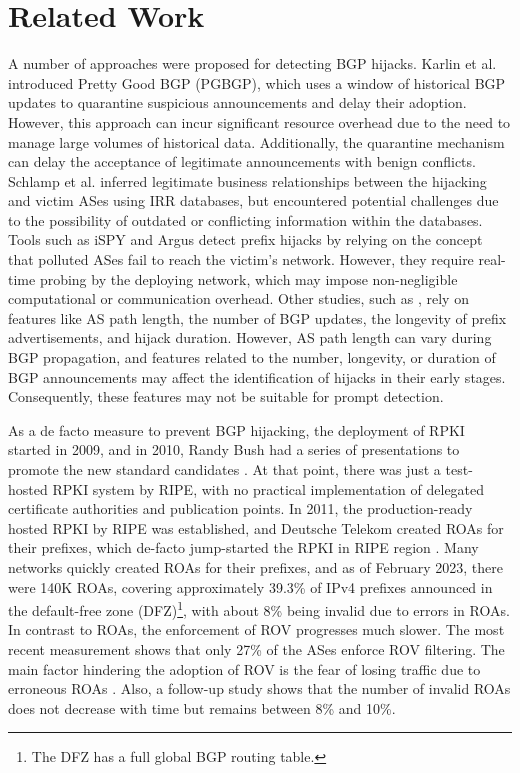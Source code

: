 \section{Related Work}
\label{sec:relatedwork}
A number of approaches were proposed for detecting BGP hijacks.
Karlin et al. \cite{karlin2006pretty} introduced Pretty Good BGP (PGBGP), which uses a window of historical BGP updates to quarantine suspicious announcements and delay their adoption. However, this approach can incur significant resource overhead due to the need to manage large volumes of historical data. Additionally, the quarantine mechanism can delay the acceptance of legitimate announcements with benign conflicts.
Schlamp et al. \cite{schlamp2016heap} inferred legitimate business relationships between the hijacking and victim ASes using IRR databases, but encountered potential challenges due to the possibility of outdated or conflicting information within the databases. Tools such as iSPY \cite{zhang2008ispy} and Argus \cite{shi2012detecting} detect prefix hijacks by relying on the concept that polluted ASes fail to reach the victim's network. However, they require real-time probing by the deploying network, which may impose non-negligible computational or communication overhead.
Other studies, such as \cite{deshpande2009online, karimi2019border, testart2019profiling, hlavacek2022smart}, rely on features like AS path length, the number of BGP updates, the longevity of prefix advertisements, and hijack duration. However, AS path length can vary during BGP propagation, and features related to the number, longevity, or duration of BGP announcements may affect the identification of hijacks in their early stages. Consequently, these features may not be suitable for prompt detection.

As a de facto measure to prevent BGP hijacking, the deployment of RPKI started in 2009, and in 2010, Randy Bush had a series of presentations to promote the new standard candidates \cite{bush:rpki:2009}. At that point, there was just a test-hosted RPKI system by RIPE, with no practical implementation of delegated certificate authorities and publication points. In 2011, the production-ready hosted RPKI by RIPE was established, and Deutsche Telekom created ROAs for their prefixes, which de-facto jump-started the RPKI in RIPE region \cite{band:rpki:2011}. Many networks quickly created ROAs for their prefixes, and as of February 2023, there were 140K ROAs, covering approximately 39.3\% of IPv4 prefixes announced in the default-free zone (DFZ)\footnote{The DFZ has a full global BGP routing table.}, with about 8\% being invalid due to errors in ROAs. In contrast to ROAs, the enforcement of ROV progresses much slower. The most recent measurement \cite{hlavacek2022behind} shows that only 27\% of the ASes enforce ROV filtering. The main factor hindering the adoption of ROV is the fear of losing traffic due to erroneous ROAs \cite{gilad2017we,iamartino2015measuring, wahlisch2012towards}. Also, a follow-up study \cite{chung2019rpki} shows that the number of invalid ROAs does not decrease with time but remains between 8\% and 10\%.

